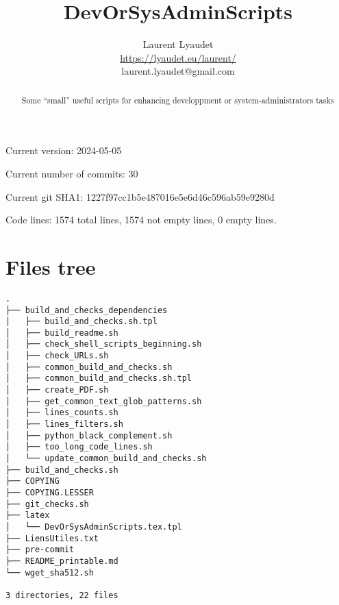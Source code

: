\documentclass{article}
\begin{document}
\author{
  Laurent Lyaudet\\
  \url{https://lyaudet.eu/laurent/}\\
  laurent.lyaudet@gmail.com
}
\title{DevOrSysAdminScripts}

\maketitle
\begin{abstract}
Some ``small'' useful scripts
for enhancing developpment or system-administrators tasks
\end{abstract}

Current version: 2024-05-05

Current number of commits: 30

Current git SHA1: 1227f97cc1b5e487016e5e6d46c596ab59e9280d

Code lines: 1574 total lines, 1574 not empty lines, 0 empty lines.

\section{Files tree}
\label{section:tree}

\begin{verbatim}
.
├── build_and_checks_dependencies
│   ├── build_and_checks.sh.tpl
│   ├── build_readme.sh
│   ├── check_shell_scripts_beginning.sh
│   ├── check_URLs.sh
│   ├── common_build_and_checks.sh
│   ├── common_build_and_checks.sh.tpl
│   ├── create_PDF.sh
│   ├── get_common_text_glob_patterns.sh
│   ├── lines_counts.sh
│   ├── lines_filters.sh
│   ├── python_black_complement.sh
│   ├── too_long_code_lines.sh
│   └── update_common_build_and_checks.sh
├── build_and_checks.sh
├── COPYING
├── COPYING.LESSER
├── git_checks.sh
├── latex
│   └── DevOrSysAdminScripts.tex.tpl
├── LiensUtiles.txt
├── pre-commit
├── README_printable.md
└── wget_sha512.sh

3 directories, 22 files
\end{verbatim}
\end{document}
